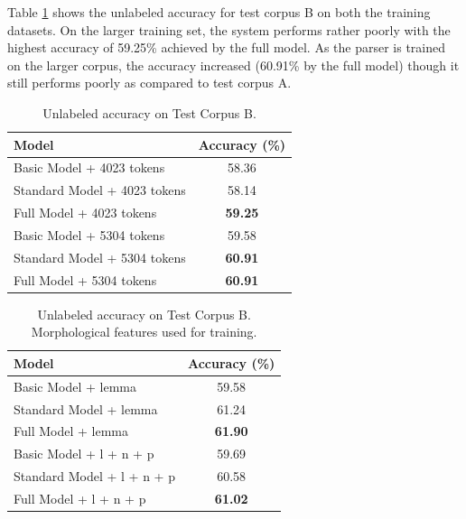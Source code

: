 \documentclass[11pt,letterpaper]{article}
\begin{document}
Table \ref{Four} shows the unlabeled accuracy for test corpus B on both the training datasets. On the larger training set, the system performs rather poorly with the highest accuracy of 59.25\% achieved by the full model. As the parser is trained on the larger corpus, the accuracy increased (60.91\% by the full model) though it still performs poorly as compared to test corpus A. 

\begin{table}
\begin{center}
  \begin{tabular}{ l || c }
  \hline
  Model & Accuracy (\%)\\
  \hline
  Basic Model + 4023 tokens & 58.36 \\
  Standard Model + 4023 tokens & 58.14 \\
  Full Model + 4023 tokens & \textbf{59.25} \\
  Basic Model + 5304 tokens & 59.58 \\
  Standard Model + 5304 tokens & \textbf{60.91} \\
  Full Model + 5304 tokens & \textbf{60.91}\\
  \hline
   \end{tabular}
\end{center}
\caption{Unlabeled accuracy on Test Corpus B.}
\label{Four}
\end{table}

\begin{table}
\begin{center}
  \begin{tabular}{ l || c }
  \hline
  Model & Accuracy (\%)\\
  \hline
  Basic Model + lemma & 59.58 \\
  Standard Model + lemma & 61.24 \\
  Full Model + lemma & \textbf{61.90} \\
  \hline
  Basic Model + l + n + p& 59.69 \\
  Standard Model + l + n + p& 60.58 \\
  Full Model + l + n + p& \textbf{61.02} \\
  \hline
   \end{tabular}
\end{center}
\caption{Unlabeled accuracy on Test Corpus B. Morphological features used for training.}
\label{Five}
\end{table}














 

\newpage




\label{lastpage}
\end{document}
